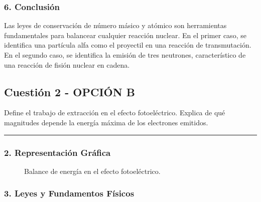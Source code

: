 \subsubsection*{6. Conclusión}
\begin{cajaconclusion}
Las leyes de conservación de número másico y atómico son herramientas fundamentales para balancear cualquier reacción nuclear. En el primer caso, se identifica una partícula alfa como el proyectil en una reacción de transmutación. En el segundo caso, se identifica la emisión de tres neutrones, característico de una reacción de fisión nuclear en cadena.
\end{cajaconclusion}

\newpage

\subsection{Cuestión 2 - OPCIÓN B}
\label{subsec:6B_2008_jun_ord}
\begin{cajaenunciado}
Define el trabajo de extracción en el efecto fotoeléctrico. Explica de qué magnitudes depende la energía máxima de los electrones emitidos.
\end{cajaenunciado}
\hrule

\subsubsection*{2. Representación Gráfica}
\begin{figure}[H]
    \centering
    \caption{Balance de energía en el efecto fotoeléctrico.}
\end{figure}

\subsubsection*{3. Leyes y Fundamentos Físicos}

